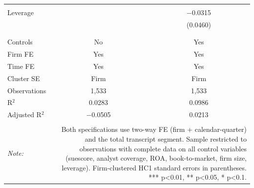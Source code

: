 \begin{table}[!htbp]
\begin{tabular}{@{\extracolsep{5pt}}lcc}
  & & \\ 
 Leverage &  & $-$0.0315 \\ 
  &  & (0.0460) \\ 
  & & \\ 
\hline \\[-1.8ex] 
Controls & No & Yes \\ 
Firm FE & Yes & Yes \\ 
Time FE & Yes & Yes \\ 
Cluster SE & Firm & Firm \\ 
Observations & 1,533 & 1,533 \\ 
R$^{2}$ & 0.0283 & 0.0986 \\ 
Adjusted R$^{2}$ & $-$0.0505 & 0.0213 \\ 
\hline 
\hline \\[-1.8ex] 
\textit{Note:}  & \multicolumn{2}{r}{Both specifications use two-way FE (firm + calendar-quarter) and the total transcript segment. Sample restricted to observations with complete data on all control variables (suescore, analyst coverage, ROA, book-to-market, firm size, leverage). Firm-clustered HC1 standard errors in parentheses. *** p<0.01, ** p<0.05, * p<0.1.} \\ 
\end{tabular} 
\end{table} 
